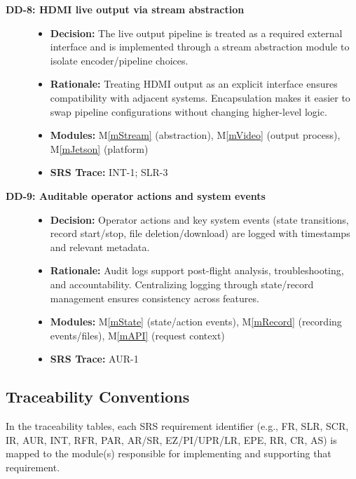 \documentclass[12pt, titlepage]{article}
\newcommand{\mref}[1]{M\ref{#1}}
\begin{document}
\begin{description}
  \item[\textbf{DD-8: HDMI live output via stream abstraction}] \leavevmode
        \begin{itemize}
          \item \textbf{Decision:} The live output pipeline is treated as a required external interface and is implemented
                through a stream abstraction module to isolate encoder/pipeline choices.
          \item \textbf{Rationale:} Treating HDMI output as an explicit interface ensures compatibility with adjacent systems.
                Encapsulation makes it easier to swap pipeline configurations without changing higher-level logic.
          \item \textbf{Modules:} \mref{mStream} (abstraction), \mref{mVideo} (output process), \mref{mJetson} (platform)
          \item \textbf{SRS Trace:} INT-1; SLR-3
        \end{itemize}

  \item[\textbf{DD-9: Auditable operator actions and system events}] \leavevmode
        \begin{itemize}
          \item \textbf{Decision:} Operator actions and key system events (state transitions, record start/stop,
                file deletion/download) are logged with timestamps and relevant metadata.
          \item \textbf{Rationale:} Audit logs support post-flight analysis, troubleshooting, and accountability.
                Centralizing logging through state/record management ensures consistency across features.
          \item \textbf{Modules:} \mref{mState} (state/action events), \mref{mRecord} (recording events/files), \mref{mAPI} (request context)
          \item \textbf{SRS Trace:} AUR-1
        \end{itemize}

\end{description}

\subsection{Traceability Conventions}

In the traceability tables, each SRS requirement identifier (e.g., FR, SLR,
SCR, IR, AUR, INT, RFR, PAR, AR/SR, EZ/PI/UPR/LR, EPE, RR, CR, AS) is mapped to
the module(s) responsible for implementing and supporting that requirement.
\end{document}
